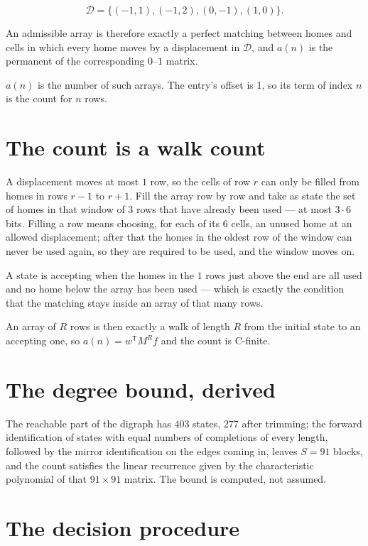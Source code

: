 \documentclass[11pt]{article}
\theoremstyle{definition}
\begin{document}
\[\mathcal{D} = \{(-1,1), (-1,2), (0,-1), (1,0)\}.\]

An admissible array is therefore exactly a perfect matching between homes and cells in which every home moves by a displacement in $\mathcal{D}$, and $a(n)$ is the permanent of the corresponding $0$--$1$ matrix.

$a(n)$ is the number of such arrays. The entry's offset is 1, so its term of index $n$ is the count for $n$ rows.

\section{The count is a walk count}

A displacement moves at most $1$ row, so the cells of row $r$ can only be filled from homes in rows $r-1$ to $r+1$. Fill the array row by row and take as state the set of homes in that window of $3$ rows that have already been used --- at most $3\cdot6$ bits. Filling a row means choosing, for each of its $6$ cells, an unused home at an allowed displacement; after that the homes in the oldest row of the window can never be used again, so they are required to be used, and the window moves on.

A state is accepting when the homes in the $1$ rows just above the end are all used and no home below the array has been used --- which is exactly the condition that the matching stays inside an array of that many rows.

An array of $R$ rows is then exactly a walk of length $R$ from the initial state to an accepting one, so $a(n) = w^{\mathsf T}M^{R}f$ and the count is C-finite.

\section{The degree bound, derived}

The reachable part of the digraph has $403$ states, $277$ after trimming; the forward identification of states with equal numbers of completions of every length, followed by the mirror identification on the edges coming in, leaves $S = 91$ blocks, and the count satisfies the linear recurrence given by the characteristic polynomial of that $91\times91$ matrix. The bound is computed, not assumed.

\section{The decision procedure}
\end{document}
